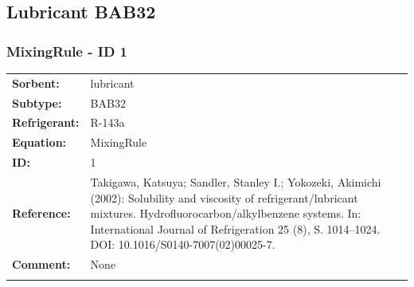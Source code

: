 \subsection{Lubricant BAB32}
%
\subsubsection{MixingRule - ID 1}
%
\begin{tabular}[l]{|lp{11.5cm}|}
\hline
\addlinespace

\textbf{Sorbent:} & lubricant \\
\textbf{Subtype:} & BAB32 \\
\textbf{Refrigerant:} & R-143a \\
\textbf{Equation:} & MixingRule \\
\textbf{ID:} & 1 \\
\textbf{Reference:} & Takigawa, Katsuya; Sandler, Stanley I.; Yokozeki, Akimichi (2002): Solubility and viscosity of refrigerant/lubricant mixtures. Hydrofluorocarbon/alkylbenzene systems. In: International Journal of Refrigeration 25 (8), S. 1014–1024. DOI: 10.1016/S0140-7007(02)00025-7. \\
\textbf{Comment:} & None \\

\addlinespace
\hline
\end{tabular}
\newline


